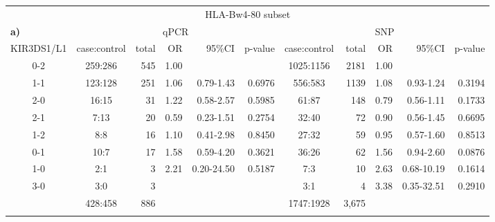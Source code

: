 \begin{table}[h]\footnotesize
\begin{tabularx}{\textwidth}{ccrrrr|crrrr}
  \multicolumn{11}{c}{HLA-Bw4-80 subset} \\
  \multicolumn{1}{l}{\bf{a)}} & \multicolumn{5}{c}{qPCR} & \multicolumn{5}{c}{SNP} \\
  \hline
    KIR3DS1/L1 & case:control & total & OR & 95\%CI & p-value & case:control & total  & OR & 95\%CI & p-value \\
  \hline
    0-2 & 259:286 & 545 & 1.00 &  &  & 1025:1156 & 2181  & 1.00 &  &  \\
    1-1 & 123:128 & 251 & 1.06 & 0.79-1.43 & 0.6976 & 556:583 & 1139  & 1.08 & 0.93-1.24 & 0.3194 \\
    2-0 & 16:15 &  31 & 1.22 & 0.58-2.57 & 0.5985 & 61:87 &  148  & 0.79 & 0.56-1.11 & 0.1733 \\
    2-1 & 7:13 &  20 & 0.59 & 0.23-1.51 & 0.2754 & 32:40 &   72  & 0.90 & 0.56-1.45 & 0.6695 \\
    1-2 & 8:8 &  16 & 1.10 & 0.41-2.98 & 0.8450 & 27:32 &   59  & 0.95 & 0.57-1.60 & 0.8513 \\
    0-1 & 10:7 &  17 & 1.58 & 0.59-4.20 & 0.3621 & 36:26 &   62  & 1.56 & 0.94-2.60 & 0.0876 \\
    1-0 & 2:1 &   3 & 2.21 & 0.20-24.50 & 0.5187 & 7:3 &   10  & 2.63 & 0.68-10.19 & 0.1614 \\
    3-0 & 3:0 &   3 &  &  &  & 3:1 &    4  & 3.38 & 0.35-32.51 & 0.2910 \\
  \hline
    & 428:458 & 886 &  &  &  & 1747:1928 & 3,675  &  & &  \\
  \\


\end{tabularx}
\end{table}
